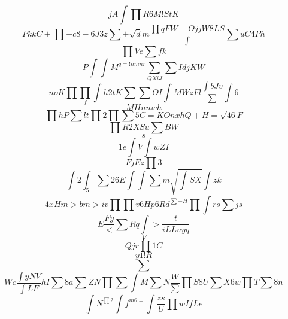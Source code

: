 \documentclass[12pt]{article}
\begin{document}
        \begin{minipage}[t][0pt]{\linewidth}

        \[jA\int\prod R {6M!} S t K\]
\[Pk k C +\prod - c 8 - 6 J 3 z\sum +\sqrt{d}m\frac{\prod q F W + O j j W 8 L S}{\int}\sum u C 4 P h\]
\[\prod V e\sum f k\]
\[P\int\int M^{q=!nmnr}\sum_{QXiJ}\sum I d j K W\]
\[noK\prod\prod_{f}\int h 2 t K\sum\sum O I\int M W z F l\frac{\int b J v}{\sum}\int 6\]
\[MHnnw h\]
\[\prod h P\sum l t\prod 2 {\prod}\sum 5 C = K O n x h Q + H =\sqrt{46}F\]
\[\prod R 2 X S u\sum B W\]
\[s\]
\[1e\int V\int w Z I\]
\[FjEz\prod 3\]
\[\int 2\int_{5}\sum 2 6 E\int\int\sum m\sqrt{\int S X}\int z k\]
\[4xHm>bm>iv {}\prod\prod v 6 H p 6 R d^{\sum - H}\prod\int r s\sum j s\]
\[E\frac{Fy}{<}\sum R q\int >\frac{t}{iLLuyq}\]
\[ V\]
\[Qjr\prod 1 C\]
\[\]
\[y1!R\]
\[\sum\]
\[Wc\frac{\int y N V}{\int L F} h I\sum 8 a\sum Z N\prod\sum\int M\sum N\frac{W}{\sum}\prod S 8 U\sum X 6 w\prod T\sum 8 n\]
\[\int N^{\prod 2}\int f^{m6=}\int\frac{zs}{U}\prod w I f L e
        \]
\end{minipage}
\end{document}
